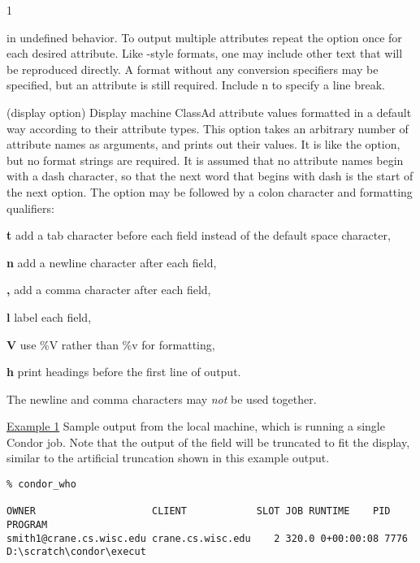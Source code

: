 \begin{ManPage}{\label{man-condor-who}}{1}
\begin{Options}
{      in undefined behavior.  To output multiple attributes
      repeat the  option once for each desired
      attribute.
      Like -style formats, one may include other
      text that will be reproduced directly.
      A format without any conversion specifiers may be specified,
      but an attribute is still required.
      Include \Bs n to specify a line break. }
     {
      (display option) Display machine ClassAd attribute values 
      formatted in a default way according to their attribute types.  
      This option takes an arbitrary number of attribute names as arguments,
      and prints out their values.  It is like the  option,
      but no format strings are required.
      It is assumed that no attribute names begin with a dash character,
      so that the next word that begins with dash is the 
      start of the next option.
      The  option may be followed by a colon character
      and formatting qualifiers:

      \textbf{t} add a tab character before each field instead of 
      the default space character,

      \textbf{n} add a newline character after each field,

      \textbf{,} add a comma character after each field,

      \textbf{l} label each field,

      \textbf{V} use \%V rather than \%v for formatting,

      \textbf{h} print headings before the first line of output.

      The newline and comma characters may \emph{not} be used together.
      }
\end{Options}

\Examples

\underline{Example 1} Sample output from the local machine,
which is running a single Condor job.
Note that the output of the  field will be truncated
to fit the display, similar to the artificial truncation shown in this 
example output.
\footnotesize
\begin{verbatim}
% condor_who 

OWNER                    CLIENT            SLOT JOB RUNTIME    PID    PROGRAM
smith1@crane.cs.wisc.edu crane.cs.wisc.edu    2 320.0 0+00:00:08 7776 D:\scratch\condor\execut
\end{verbatim}
\normalsize


\end{ManPage}
